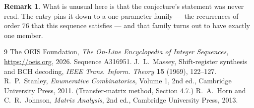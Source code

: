 \documentclass[11pt,a4paper]{article}
\theoremstyle{plain}
\theoremstyle{definition}
\newtheorem{remark}[theorem]{Remark}
\begin{document}
\begin{remark}
What is unusual here is that the conjecture's statement was never read. The entry pins it down
to a one-parameter family --- the recurrences of order $76$ that this sequence satisfies
--- and that family turns out to have exactly one member.
\end{remark}

\begin{thebibliography}{9}
 The OEIS Foundation, \emph{The On-Line Encyclopedia of Integer
Sequences}, \url{https://oeis.org}, 2026. Sequence A316951.
 J.~L.~Massey, Shift-register synthesis and BCH decoding, \emph{IEEE
Trans. Inform. Theory} \textbf{15} (1969), 122--127.
 R.~P.~Stanley, \emph{Enumerative Combinatorics}, Volume 1, 2nd ed.,
Cambridge University Press, 2011. (Transfer-matrix method, Section 4.7.)
 R.~A.~Horn and C.~R.~Johnson, \emph{Matrix Analysis}, 2nd ed., Cambridge
University Press, 2013.
\end{thebibliography}
\end{document}

